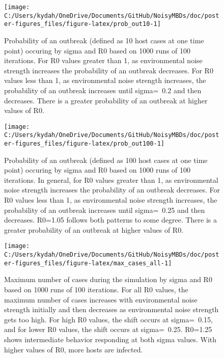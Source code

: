 \documentclass[
]{article}
\begin{document}
\begin{figure}[H]

{\centering \texttt{[image: C:/Users/kydah/OneDrive/Documents/GitHub/NoisyMBDs/doc/poster-figures\_files/figure-latex/prob\_out10-1]} 

}

\caption{\label{fig:SDEprob_out10} Probability of an outbreak (defined as 10 host cases at one time point) occuring by sigma and R0 based on 1000 runs of 100 iterations. For R0 values greater than 1, as environmental noise strength increases the probability of an outbreak decreases. For R0 values less than 1, as environmental noise strength increases, the probability of an outbreak increases until sigma=~0.2 and then decreases. There is a greater probability of an outbreak at higher values of R0.}\label{fig:prob_out10}
\end{figure}
\begin{figure}[H]

{\centering \texttt{[image: C:/Users/kydah/OneDrive/Documents/GitHub/NoisyMBDs/doc/poster-figures\_files/figure-latex/prob\_out100-1]} 

}

\caption{\label{fig:SDEprob_out100} Probability of an outbreak (defined as 100 host cases at one time point) occuring by sigma and R0 based on 1000 runs of 100 iterations. In general, for R0 values greater than 1, as environmental noise strength increases the probability of an outbreak decreases. For R0 values less than 1, as environmental noise strength increases, the probability of an outbreak increases until sigma=~0.25 and then decreases. R0=1.05 follows both patterns to some degree. There is a greater probability of an outbreak at higher values of R0.}\label{fig:prob_out100}
\end{figure}
\begin{figure}[H]

{\centering \texttt{[image: C:/Users/kydah/OneDrive/Documents/GitHub/NoisyMBDs/doc/poster-figures\_files/figure-latex/max\_cases\_all-1]} 

}

\caption{\label{fig:SDEmax_cases_all} Maximum number of cases during the simulation by sigma and R0 based on 1000 runs of 100 iterations. For all R0 values, the maximum number of cases increases with environmental noise strength initially and then decreases as environmental noise strength gets too high. For high R0 values, the shift occurs at sigma=~0.15, and for lower R0 values, the shift occurs at sigma=~0.25. R0=1.25 shows intermediate behavior responding at both sigma values. With higher values of R0, more hosts are infected.}\label{fig:max_cases_all}
\end{figure}
\end{document}
